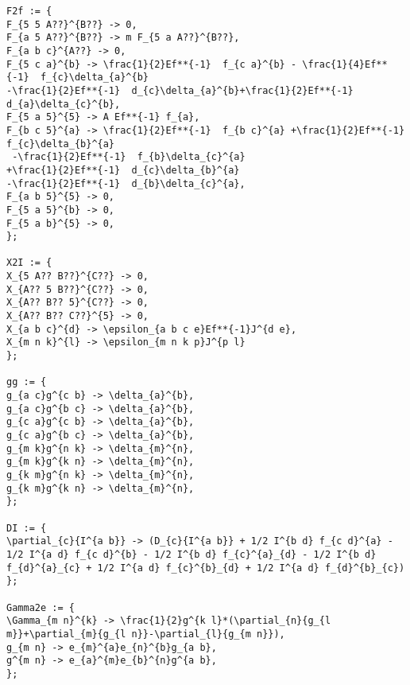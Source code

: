 \documentclass[11pt]{article}
\begin{document}
{\begin{verbatim}
F2f := {
F_{5 5 A??}^{B??} -> 0,
F_{a 5 A??}^{B??} -> m F_{5 a A??}^{B??},
F_{a b c}^{A??} -> 0,
F_{5 c a}^{b} -> \frac{1}{2}Ef**{-1}  f_{c a}^{b} - \frac{1}{4}Ef**{-1}  f_{c}\delta_{a}^{b}
-\frac{1}{2}Ef**{-1}  d_{c}\delta_{a}^{b}+\frac{1}{2}Ef**{-1}  d_{a}\delta_{c}^{b},
F_{5 a 5}^{5} -> A Ef**{-1} f_{a},
F_{b c 5}^{a} -> \frac{1}{2}Ef**{-1}  f_{b c}^{a} +\frac{1}{2}Ef**{-1}  f_{c}\delta_{b}^{a}
 -\frac{1}{2}Ef**{-1}  f_{b}\delta_{c}^{a} 
+\frac{1}{2}Ef**{-1}  d_{c}\delta_{b}^{a}
-\frac{1}{2}Ef**{-1}  d_{b}\delta_{c}^{a},
F_{a b 5}^{5} -> 0,
F_{5 a 5}^{b} -> 0,
F_{5 a b}^{5} -> 0,
};

X2I := {
X_{5 A?? B??}^{C??} -> 0,
X_{A?? 5 B??}^{C??} -> 0,
X_{A?? B?? 5}^{C??} -> 0,
X_{A?? B?? C??}^{5} -> 0,
X_{a b c}^{d} -> \epsilon_{a b c e}Ef**{-1}J^{d e},
X_{m n k}^{l} -> \epsilon_{m n k p}J^{p l}
};

gg := {
g_{a c}g^{c b} -> \delta_{a}^{b},
g_{a c}g^{b c} -> \delta_{a}^{b},
g_{c a}g^{c b} -> \delta_{a}^{b},
g_{c a}g^{b c} -> \delta_{a}^{b},
g_{m k}g^{n k} -> \delta_{m}^{n},
g_{m k}g^{k n} -> \delta_{m}^{n},
g_{k m}g^{n k} -> \delta_{m}^{n},
g_{k m}g^{k n} -> \delta_{m}^{n},
};

DI := {
\partial_{c}{I^{a b}} -> (D_{c}{I^{a b}} + 1/2 I^{b d} f_{c d}^{a} - 1/2 I^{a d} f_{c d}^{b} - 1/2 I^{b d} f_{c}^{a}_{d} - 1/2 I^{b d} f_{d}^{a}_{c} + 1/2 I^{a d} f_{c}^{b}_{d} + 1/2 I^{a d} f_{d}^{b}_{c})
};

Gamma2e := {
\Gamma_{m n}^{k} -> \frac{1}{2}g^{k l}*(\partial_{n}{g_{l m}}+\partial_{m}{g_{l n}}-\partial_{l}{g_{m n}}),
g_{m n} -> e_{m}^{a}e_{n}^{b}g_{a b},
g^{m n} -> e_{a}^{m}e_{b}^{n}g^{a b},
};
\end{verbatim}}
\end{document}
